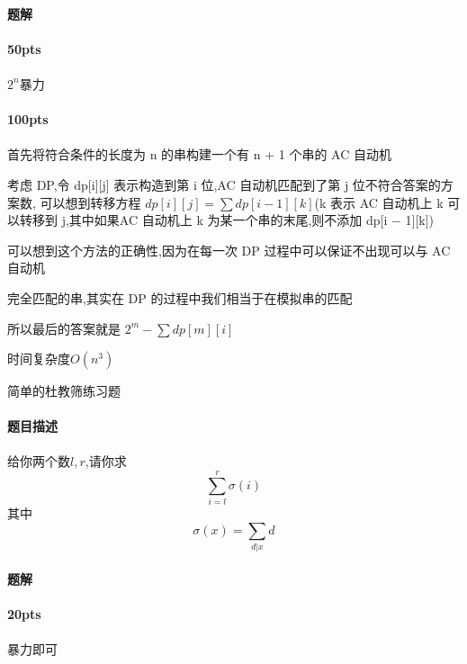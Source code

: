 \documentclass[UTF8]{ctexart}
\begin{document}
\paragraph{题解}
\paragraph{50pts}
\paragraph{}$2^n$暴力
\paragraph{100pts}
\paragraph{}
首先将符合条件的长度为 n 的串构建一个有 n + 1 个串的 AC 自动机

考虑 DP,令 dp[i][j] 表示构造到第 i 位,AC 自动机匹配到了第 j 位不符合答案的方案数,
可以想到转移方程 $dp[i][j] =\sum dp[i − 1][k]$(k 表示 AC 自动机上 k 可以转移到 j,其中如果AC 自动机上 k 为某一个串的末尾,则不添加 dp[i − 1][k])

可以想到这个方法的正确性,因为在每一次 DP 过程中可以保证不出现可以与 AC 自动机

完全匹配的串,其实在 DP 的过程中我们相当于在模拟串的匹配

所以最后的答案就是 $2^m −\sum　dp[m][i]$

时间复杂度$O(n^3)$
\clearpage
\begin{center}
    \large{简单的杜教筛练习题}
\end{center}
\paragraph{题目描述}
\paragraph{}
给你两个数$l,r$,请你求
$$
\sum\limits_{i=l}^r{\sigma(i)}
$$
其中
$$
\sigma(x)=\sum\limits_{d|x} d
$$
\paragraph{题解}
\paragraph{20pts}
\paragraph{}暴力即可
\end{document}
